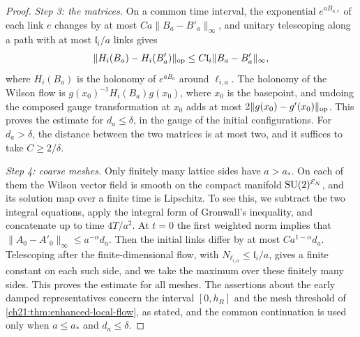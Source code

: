 \begin{proof}
\emph{Step 3: the matrices.} On a common time interval, the exponential $e^{aB_{a,e}}$ of each link $e$ changes by at most $Ca\|B_a-B'_a\|_\infty$, and unitary telescoping along a path with at most $\mathfrak l_i/a$ links gives
\[
 \|H_i(B_a)-H_i(B'_a)\|_{\rm op}\le C\mathfrak l_i\|B_a-B'_a\|_\infty,
\]
where $H_i(B_a)$ is the holonomy of $e^{aB_a}$ around $\ell_{i,a}$. The holonomy of the Wilson flow is $g(x_0)^{-1}H_i(B_a)g(x_0)$, where $x_0$ is the basepoint, and undoing the composed gauge transformation at $x_0$ adds at most $2\|g(x_0)-g'(x_0)\|_{\rm op}$. This proves the estimate for $d_a\le\delta$, in the gauge of the initial configurations. For $d_a>\delta$, the distance between the two matrices is at most two, and it suffices to take $C\ge2/\delta$.

\emph{Step 4: coarse meshes.} Only finitely many lattice sides have $a>a_*$. On each of them the Wilson vector field is smooth on the compact manifold $\mathrm{SU}(2)^{\mathcal E_{N}}$, and its solution map over a finite time is Lipschitz. To see this, we subtract the two integral equations, apply the integral form of Gronwall's inequality, and concatenate up to time $4T/a^2$. At $t=0$ the first weighted norm implies that $\|A_0-A'_0\|_\infty\le a^{-\alpha}d_a$. Then the initial links differ by at most $Ca^{1-\alpha}d_a$. Telescoping after the finite-dimensional flow, with $N_{\ell_{i,a}}\le\mathfrak l_i/a$, gives a finite constant on each such side, and we take the maximum over these finitely many sides. This proves the estimate for all meshes. The assertions about the early damped representatives concern the interval $[0,h_R]$ and the mesh threshold of \cref{ch21:thm:enhanced-local-flow}, as stated, and the common continuation is used only when $a\le a_*$ and $d_a\le\delta$.
\end{proof}

